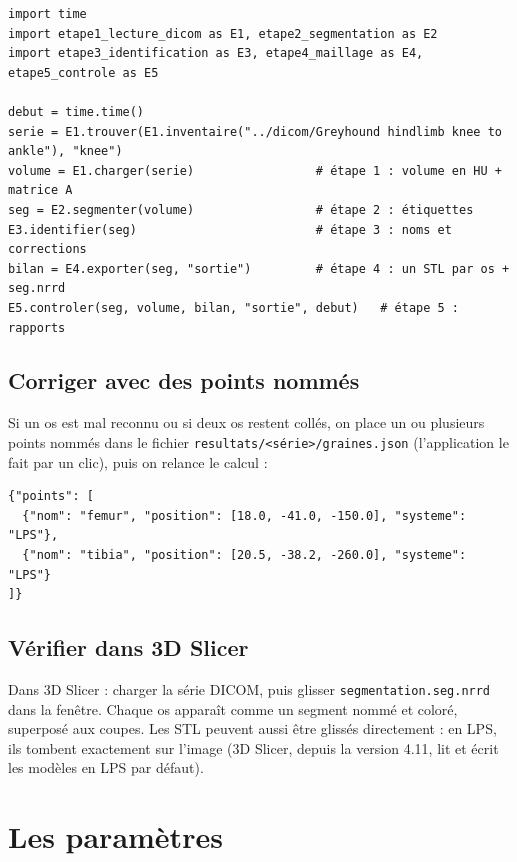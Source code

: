 \documentclass[11pt,a4paper]{article}
\newcommand{\fichier}[1]{\texttt{\small #1}}
\begin{document}
\begin{Verbatim}
import time
import etape1_lecture_dicom as E1, etape2_segmentation as E2
import etape3_identification as E3, etape4_maillage as E4, etape5_controle as E5

debut = time.time()
serie = E1.trouver(E1.inventaire("../dicom/Greyhound hindlimb knee to ankle"), "knee")
volume = E1.charger(serie)                 # étape 1 : volume en HU + matrice A
seg = E2.segmenter(volume)                 # étape 2 : étiquettes
E3.identifier(seg)                         # étape 3 : noms et corrections
bilan = E4.exporter(seg, "sortie")         # étape 4 : un STL par os + seg.nrrd
E5.controler(seg, volume, bilan, "sortie", debut)   # étape 5 : rapports
\end{Verbatim}

\subsection{Corriger avec des points nommés}
\label{sec-graines-json}

Si un os est mal reconnu ou si deux os restent collés, on place un ou plusieurs points nommés dans le fichier
\fichier{resultats/<série>/graines.json} (l'application le fait par un clic), puis on relance le calcul :

\begin{Verbatim}
{"points": [
  {"nom": "femur", "position": [18.0, -41.0, -150.0], "systeme": "LPS"},
  {"nom": "tibia", "position": [20.5, -38.2, -260.0], "systeme": "LPS"}
]}
\end{Verbatim}

\subsection{Vérifier dans 3D Slicer}

Dans 3D Slicer : charger la série DICOM, puis glisser \fichier{segmentation.seg.nrrd} dans la fenêtre. Chaque os
apparaît comme un segment nommé et coloré, superposé aux coupes. Les STL peuvent aussi être glissés directement : en
LPS, ils tombent exactement sur l'image (3D Slicer, depuis la version 4.11, lit et écrit les modèles en LPS par
défaut).

\clearpage
\appendix
\section{Les paramètres}
\label{ann-parametres}
\end{document}
